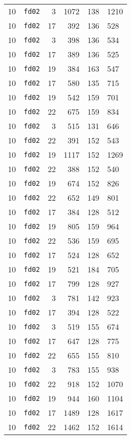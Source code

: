 \documentclass{article}
\begin{document}
\begin{table}[h!]
\begin{tabular}{llrrrl}
    10 & \texttt{fd02} & 3 & 1072 & 138 & 1210 \\
    10 & \texttt{fd02} & 17 & 392 & 136 & 528 \\
    10 & \texttt{fd02} & 3 & 398 & 136 & 534 \\
    10 & \texttt{fd02} & 17 & 389 & 136 & 525 \\
    10 & \texttt{fd02} & 19 & 384 & 163 & 547 \\
    10 & \texttt{fd02} & 17 & 580 & 135 & 715 \\
    10 & \texttt{fd02} & 19 & 542 & 159 & 701 \\
    10 & \texttt{fd02} & 22 & 675 & 159 & 834 \\
    10 & \texttt{fd02} & 3 & 515 & 131 & 646 \\
    10 & \texttt{fd02} & 22 & 391 & 152 & 543 \\
    10 & \texttt{fd02} & 19 & 1117 & 152 & 1269 \\
    10 & \texttt{fd02} & 22 & 388 & 152 & 540 \\
    10 & \texttt{fd02} & 19 & 674 & 152 & 826 \\
    10 & \texttt{fd02} & 22 & 652 & 149 & 801 \\
    10 & \texttt{fd02} & 17 & 384 & 128 & 512 \\
    10 & \texttt{fd02} & 19 & 805 & 159 & 964 \\
    10 & \texttt{fd02} & 22 & 536 & 159 & 695 \\
    10 & \texttt{fd02} & 17 & 524 & 128 & 652 \\
    10 & \texttt{fd02} & 19 & 521 & 184 & 705 \\
    10 & \texttt{fd02} & 17 & 799 & 128 & 927 \\
    10 & \texttt{fd02} & 3 & 781 & 142 & 923 \\
    10 & \texttt{fd02} & 17 & 394 & 128 & 522 \\
    10 & \texttt{fd02} & 3 & 519 & 155 & 674 \\
    10 & \texttt{fd02} & 17 & 647 & 128 & 775 \\
    10 & \texttt{fd02} & 22 & 655 & 155 & 810 \\
    10 & \texttt{fd02} & 3 & 783 & 155 & 938 \\
    10 & \texttt{fd02} & 22 & 918 & 152 & 1070 \\
    10 & \texttt{fd02} & 19 & 944 & 160 & 1104 \\
    10 & \texttt{fd02} & 17 & 1489 & 128 & 1617 \\
    10 & \texttt{fd02} & 22 & 1462 & 152 & 1614 \\

\end{tabular}
\end{table}
\end{document}
